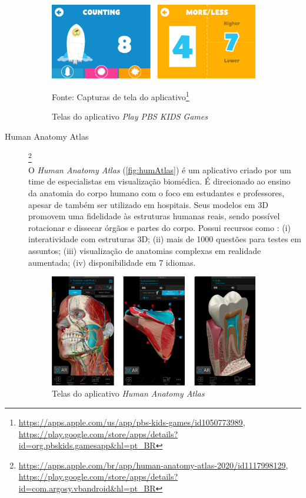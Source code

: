 \begin{description}
\begin{figure}[H]
\centering
    \caption{Telas do aplicativo \textit{Play PBS KIDS Games}}
    \label{fig:pbs}
    \includegraphics[width=0.9\textwidth]{Figuras/pbsKids.jpg}
    
    Fonte: Capturas de tela do aplicativo\footnote{\url{https://apps.apple.com/us/app/pbs-kids-games/id1050773989}, \url{https://play.google.com/store/apps/details?id=org.pbskids.gamesapp&hl=pt_BR}}
\end{figure}

\item[Human Anatomy Atlas]\footnote{\url{https://apps.apple.com/br/app/human-anatomy-atlas-2020/id1117998129}, \url{https://play.google.com/store/apps/details?id=com.argosy.vbandroid&hl=pt_BR}} \hfill \\
O \textit{Human Anatomy Atlas} (\autoref{fig:humAtlas}) é um aplicativo criado por um time de especialistas em visualização biomédica. É direcionado ao ensino da anatomia do corpo humano com o foco em estudantes e professores, apesar de também ser utilizado em hospitais. Seus modelos em 3D promovem uma fidelidade às estruturas humanas reais, sendo possível rotacionar e dissecar órgãos e partes do corpo. Possui recursos como : (i) interatividade com estruturas 3D; (ii) mais de 1000 questões para testes em assuntos; (iii) visualização de anatomias complexas em realidade aumentada; (iv) disponibilidade em 7 idiomas.

\begin{figure}[ht!]
\centering
    \caption{Telas do aplicativo \textit{Human Anatomy Atlas}}
    \label{fig:humAtlas}
    \includegraphics[width=0.9\textwidth]{Figuras/humanAtlas.png}
    

\end{figure}
\end{description}
